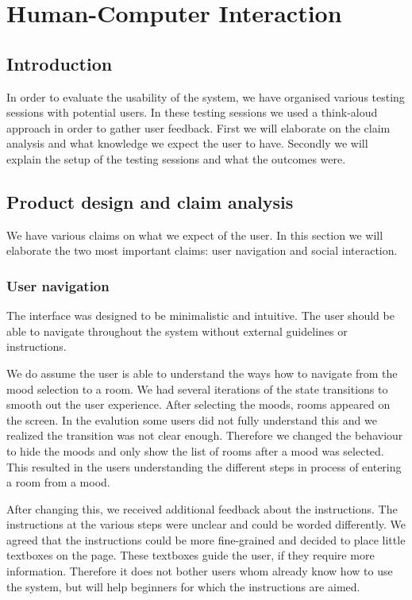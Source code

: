 \chapter{Human-Computer Interaction}

\section{Introduction}
In order to evaluate the usability of the system, we have organised various testing sessions with potential users.
In these testing sessions we used a think-aloud approach in order to gather user feedback.
First we will elaborate on the claim analysis and what knowledge we expect the user to have.
Secondly we will explain the setup of the testing sessions and what the outcomes were.

\section{Product design and claim analysis}
We have various claims on what we expect of the user.
In this section we will elaborate the two most important claims: user navigation and social interaction.

\subsection{User navigation}

The interface was designed to be minimalistic and intuitive.
The user should be able to navigate throughout the system without external guidelines or instructions.

We do assume the user is able to understand the ways how to navigate from the mood selection to a room.
We had several iterations of the state transitions to smooth out the user experience.
After selecting the moods, rooms appeared on the screen.
In the evalution some users did not fully understand this and we realized the transition was not clear enough.
Therefore we changed the behaviour to hide the moods and only show the list of rooms after a mood was selected.
This resulted in the users understanding the different steps in process of entering a room from a mood.

After changing this, we received additional feedback about the instructions.
The instructions at the various steps were unclear and could be worded differently.
We agreed that the instructions could be more fine-grained and decided to place little textboxes on the page.
These textboxes guide the user, if they require more information.
Therefore it does not bother users whom already know how to use the system, but will help beginners for which the instructions are aimed.

